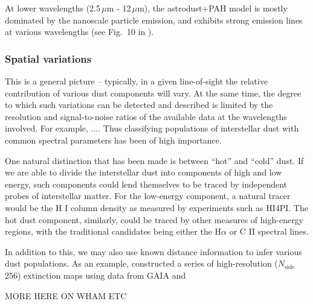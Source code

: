 \documentclass{aa}
\def\nside{$N_{\mathrm{side}}$}
\begin{document}
At lower wavelengths (2.5\,$\mu$m - 12\,$\mu$m), the astrodust+PAH model is
mostly dominated by the nanoscale particle emission, and exhibits strong
emission lines at various wavelengths (see Fig.~10 in \cite{Hensley2023}).

\subsubsection{Spatial variations}
This is a general picture -- typically, in a given line-of-sight the relative
contribution of various dust components will vary. At the same time, the degree
to which such variations can be detected and described is limited by the
resolution and signal-to-noise ratios of the available data at the wavelengths
involved. For example, .... Thus classifying populations of interstellar dust
with common spectral parameters has been of high importance.

One natural distinction that has been made is between ``hot'' and ``cold''
dust. If we are able to divide the interstellar dust into components of high
and low energy, such components could lend themselves to be traced by
independent probes of interstellar matter. For the low-energy component, a
natural tracer would be the H I column density as measured by experiments such
as HI4PI. The hot dust component, similarly, could be traced by other measures
of high-energy regions, with the traditional candidates being either the
H$\alpha$ or C II spectral lines.

In addition to this, we may also use known distance information to infer
various dust populations. As an example, \cite{edenhofer:2024} constructed a
series of high-resolution (\nside 256) extinction maps using data from GAIA and

MORE HERE ON WHAM ETC
\end{document}
